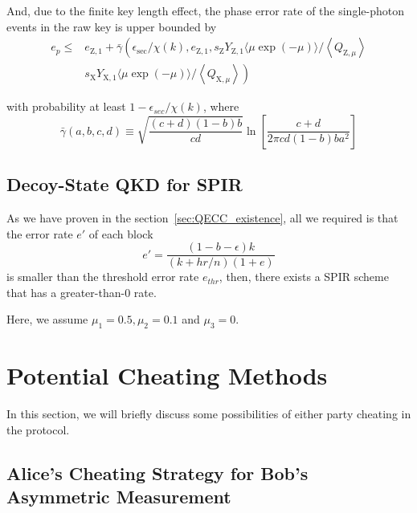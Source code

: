 \documentclass[%
 reprint,
superscriptaddress,
 amsmath,amssymb,
 aps,
]{revtex4-2}
\begin{document}
And, due to the finite key length effect, the phase error rate of the single-photon events in the raw key is upper bounded by
\begin{equation}
    \begin{aligned}
e_p \leqslant & e_{\mathrm{Z}, 1}+\bar{\gamma}\left(\epsilon_{\mathrm{sec}} / \chi(k), e_{\mathrm{Z}, 1}, s_{\mathrm{Z}} Y_{\mathrm{Z}, 1}\langle\mu \exp (-\mu)\rangle /\left\langle Q_{\mathrm{Z}, \mu}\right\rangle\right. \\
& \left.s_{\mathrm{X}} Y_{\mathrm{X}, 1}\langle\mu \exp (-\mu)\rangle /\left\langle Q_{\mathrm{X}, \mu}\right\rangle\right)
\end{aligned}
\end{equation}

with probability at least $1 - \epsilon_{sec}/χ (k)$, where
\begin{equation}
    \bar{\gamma}(a,b,c,d) \equiv \sqrt{\frac{(c+d)(1-b)b}{cd}} \ln \left[ \frac{c+d}{2\pi cd(1-b)ba^{2}} \right]
\end{equation}

\subsection{Decoy-State QKD for SPIR}

As we have proven in the section~\ref{sec:QECC_existence}, all we required is that the error rate $e'$ of each block 
\begin{equation}
    e'=\frac{(1-b-\epsilon)k}{(k+hr/n)(1+e)}
\end{equation}
is smaller than the threshold error rate $e_{thr}$, then, there exists a SPIR scheme that has a greater-than-0 rate.

Here, we assume $\mu_1 = 0.5, \mu_2 = 0.1$ and $\mu_3=0$.



\section{Potential Cheating Methods}
\label{sec:potential_cheating}

In this section, we will briefly discuss some possibilities of either party cheating in the protocol.

\subsection{Alice's Cheating Strategy for Bob's Asymmetric Measurement}
\label{sec:Alice_cheating_asymmetric_measurement}
\end{document}

